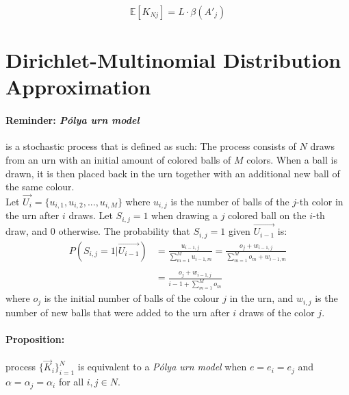 \documentclass[11pt]{article}
\begin{document}
\begin{equation}\label{linearEq}
\mathbb{E}[K_{Nj}] = L\cdot \beta(A'_j)
\end{equation}


\section{Dirichlet-Multinomial Distribution Approximation}
\paragraph{Reminder: \textit{Pólya urn model}}  is a stochastic process that is defined as such: 
The process consists of $N$ draws from an urn with an initial amount of colored balls of $M$ colors. When a ball is drawn, it is then placed back in the urn together with an additional new ball of the same colour.\\
Let $\vec{U_i} = \{u_{i,1},u_{i,2},...,u_{i,M}\}$  where $u_{i,j}$ is the number of balls of the $j$-th color in the urn after $i$ draws.
Let $S_{i,j}=1$ when drawing a $j$ colored ball on the $i$-th draw, and $0$ otherwise. The probability that $S_{i,j}=1$ given $\vec{U_{i-1}}$ is:
\begin{equation}\label{polya}
\begin{split}
P(S_{i,j} = 1 | \vec{U_{i-1}}) & = \frac{u_{i-1,j}}{\sum\limits_{m=1}^{M} u_{i-1,m}} = \frac{o_j + w_{i-1,j}}{\sum\limits_{m=1}^{M} o_m + w_{i-1,m}}\\\\
 & = \frac{o_j + w_{i-1,j}}{i-1 + \sum\limits_{m=1}^{M} o_m}
\end{split}
\end{equation}
where $o_j$ is the initial number of balls of the colour $j$ in the urn, and $w_{i,j}$ is the number of new balls that were added to the urn after $i$ draws of the color $j$.

\paragraph{Proposition:} process $\big\{\vec{K}_i\big\}_{i=1}^N$ is equivalent to a \textit{Pólya urn model} when $e=e_i=e_j$ and $\alpha=\alpha_j=\alpha_i$ for all $i,j \in N$.
\end{document}
